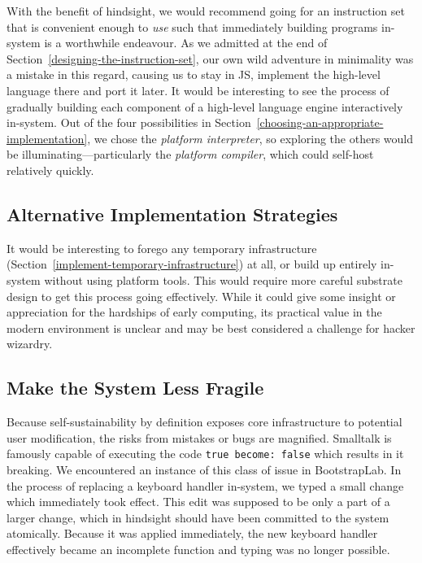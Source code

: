 \documentclass[ twoside,openright,titlepage,numbers=noenddot,headinclude,footinclude,cleardoublepage=empty,abstract=on,
                BCOR=5mm,paper=a4,fontsize=11pt
                ]{scrreprt}
\theoremstyle{definition}
\begin{document}
With the benefit of hindsight, we would recommend going for an
instruction set that is convenient enough to \emph{use} such that
immediately building programs in-system is a worthwhile endeavour. As we
admitted at the end of Section~\ref{designing-the-instruction-set}, our
own wild adventure in minimality was a mistake in this regard, causing
us to stay in \ac{JS}, implement the high-level language there and port
it later. It would be interesting to see the process of gradually
building each component of a high-level language engine interactively
in-system. Out of the four possibilities in
Section~\ref{choosing-an-appropriate-implementation}, we chose the
\emph{platform interpreter}, so exploring the others would be
illuminating---particularly the \emph{platform compiler}, which could
self-host relatively quickly.

\hypertarget{alternative-implementation-strategies}{\subsection{Alternative Implementation
Strategies}\label{alternative-implementation-strategies}}

It would be interesting to forego any temporary infrastructure
(Section~\ref{implement-temporary-infrastructure}) at all, or build up
entirely in-system without using platform tools. This would require more
careful substrate design to get this process going effectively. While it
could give some insight or appreciation for the hardships of early
computing, its practical value in the modern environment is unclear and
may be best considered a challenge for hacker wizardry.

\hypertarget{make-the-system-less-fragile}{\subsection{Make the System Less
Fragile}\label{make-the-system-less-fragile}}

Because self-sustainability by definition exposes core infrastructure to
potential user modification, the risks from mistakes or bugs are
magnified. Smalltalk is famously capable of executing the code
\texttt{true\ become:\ false} which results in it breaking. We
encountered an instance of this class of issue in BootstrapLab. In the
process of replacing a keyboard handler in-system, we typed a small
change which immediately took effect. This edit was supposed to be only
a part of a larger change, which in hindsight should have been committed
to the system atomically. Because it was applied immediately, the new
keyboard handler effectively became an incomplete function and typing
was no longer possible.
\end{document}
